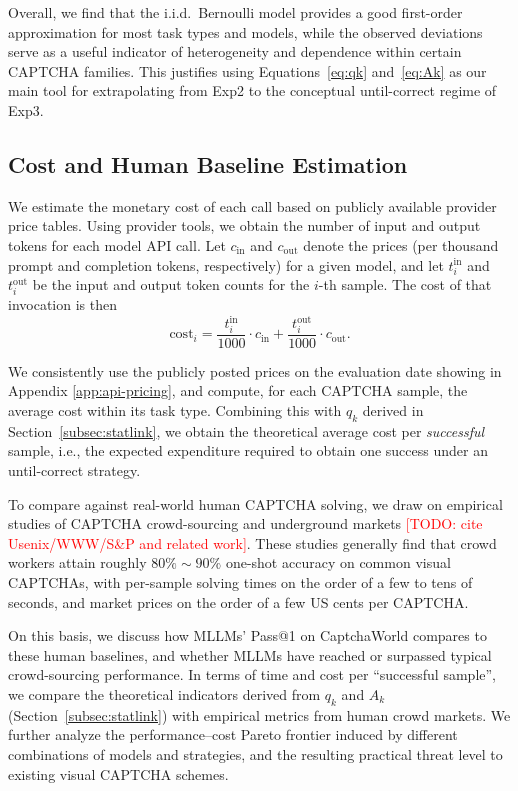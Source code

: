 \documentclass[sigconf, review]{acmart}
\begin{document}
Overall, we find that the i.i.d.\ Bernoulli model provides a good first-order approximation for most task types and models, while the observed deviations serve as a useful indicator of heterogeneity and dependence within certain CAPTCHA families.
This justifies using Equations~\eqref{eq:qk} and~\eqref{eq:Ak} as our main tool for extrapolating from Exp2 to the conceptual until-correct regime of Exp3.


\subsection{Cost and Human Baseline Estimation}
\label{subsec:cost}

We estimate the monetary cost of each call based on publicly available provider price tables. Using provider tools, we obtain the number of input and output tokens for each model API call. Let $c_{\mathrm{in}}$ and $c_{\mathrm{out}}$ denote the prices (per thousand prompt and completion tokens, respectively) for a given model, and let $t_{i}^{\mathrm{in}}$ and $t_{i}^{\mathrm{out}}$ be the input and output token counts for the $i$-th sample. The cost of that invocation is then
\begin{equation}
  \mathrm{cost}_{i} = \frac{t_{i}^{\mathrm{in}}}{1000} \cdot c_{\mathrm{in}} 
                    + \frac{t_{i}^{\mathrm{out}}}{1000} \cdot c_{\mathrm{out}}.
\end{equation}

We consistently use the publicly posted prices on the evaluation date showing in Appendix \ref{app:api-pricing}, and compute, for each CAPTCHA sample, the average cost within its task type. Combining this with $q_k$ derived in Section~\ref{subsec:statlink}, we obtain the theoretical average cost per \emph{successful} sample, i.e., the expected expenditure required to obtain one success under an until-correct strategy.

To compare against real-world human CAPTCHA solving, we draw on empirical studies of CAPTCHA crowd-sourcing and underground markets \textcolor{red}{[TODO: cite Usenix/WWW/S\&P and related work]}. These studies generally find that crowd workers attain roughly $\mathrm{80}\%\sim\mathrm{90}\%$ one-shot accuracy on common visual CAPTCHAs, with per-sample solving times on the order of a few to tens of seconds, and market prices on the order of a few US cents per CAPTCHA.

On this basis, we discuss how MLLMs’ Pass@1 on CaptchaWorld compares to these human baselines, and whether MLLMs have reached or surpassed typical crowd-sourcing performance. In terms of time and cost per “successful sample”, we compare the theoretical indicators derived from $q_k$ and $A_k$ (Section~\ref{subsec:statlink}) with empirical metrics from human crowd markets. We further analyze the performance--cost Pareto frontier induced by different combinations of models and strategies, and the resulting practical threat level to existing visual CAPTCHA schemes.
\end{document}
